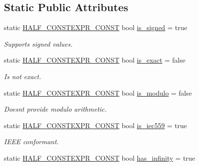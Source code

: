 \subsection*{Static Public Attributes}
\begin{DoxyCompactItemize}
\item 
static \hyperlink{half_8hpp_a5df92c245e5d4e45d35fad7b6de73354}{H\+A\+L\+F\+\_\+\+C\+O\+N\+S\+T\+E\+X\+P\+R\+\_\+\+C\+O\+N\+ST} bool \hyperlink{classstd_1_1numeric__limits_3_01half__float_1_1half_01_4_a259bf36384293f18c4fbd40011b75107}{is\+\_\+signed} = true
\begin{DoxyCompactList}\small\item\em Supports signed values. \end{DoxyCompactList}\item 
static \hyperlink{half_8hpp_a5df92c245e5d4e45d35fad7b6de73354}{H\+A\+L\+F\+\_\+\+C\+O\+N\+S\+T\+E\+X\+P\+R\+\_\+\+C\+O\+N\+ST} bool \hyperlink{classstd_1_1numeric__limits_3_01half__float_1_1half_01_4_a503b8e3d6c6828c85b21c17fda0e2bf2}{is\+\_\+exact} = false
\begin{DoxyCompactList}\small\item\em Is not exact. \end{DoxyCompactList}\item 
static \hyperlink{half_8hpp_a5df92c245e5d4e45d35fad7b6de73354}{H\+A\+L\+F\+\_\+\+C\+O\+N\+S\+T\+E\+X\+P\+R\+\_\+\+C\+O\+N\+ST} bool \hyperlink{classstd_1_1numeric__limits_3_01half__float_1_1half_01_4_a77ce83e1744e781334a6c7f68e2b7e38}{is\+\_\+modulo} = false
\begin{DoxyCompactList}\small\item\em Doesn\textquotesingle{}t provide modulo arithmetic. \end{DoxyCompactList}\item 
static \hyperlink{half_8hpp_a5df92c245e5d4e45d35fad7b6de73354}{H\+A\+L\+F\+\_\+\+C\+O\+N\+S\+T\+E\+X\+P\+R\+\_\+\+C\+O\+N\+ST} bool \hyperlink{classstd_1_1numeric__limits_3_01half__float_1_1half_01_4_acdf5541f7eda3f27d4537c1e4c4528ad}{is\+\_\+iec559} = true
\begin{DoxyCompactList}\small\item\em I\+E\+EE conformant. \end{DoxyCompactList}\item 
static \hyperlink{half_8hpp_a5df92c245e5d4e45d35fad7b6de73354}{H\+A\+L\+F\+\_\+\+C\+O\+N\+S\+T\+E\+X\+P\+R\+\_\+\+C\+O\+N\+ST} bool \hyperlink{classstd_1_1numeric__limits_3_01half__float_1_1half_01_4_a808d88d6c6782112d8c8ce51ee77c4dd}{has\+\_\+infinity} = true

\end{DoxyCompactItemize}
